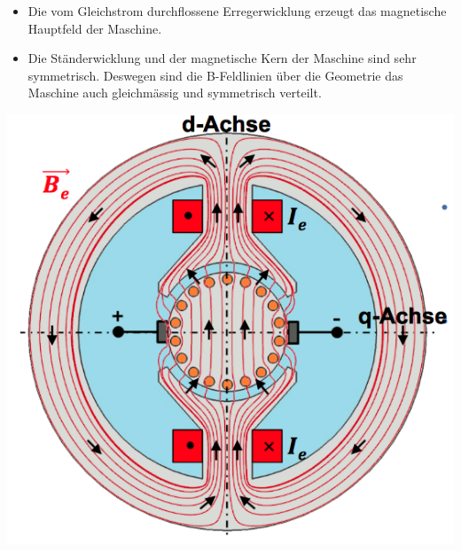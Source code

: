 \begin{minipage}{0.6 \linewidth}
\begin{itemize}
\item Die vom Gleichstrom durchflossene Erregerwicklung erzeugt das magnetische Hauptfeld der Maschine.
\item Die Ständerwicklung und der magnetische Kern der Maschine sind sehr symmetrisch. Deswegen sind die B-Feldlinien über die Geometrie das Maschine auch gleichmässig und symmetrisch verteilt. 
\end{itemize}
\end{minipage}
\begin{minipage}{0.4 \linewidth}
\includegraphics[width = \linewidth]{./Pics/VL45/Ankerruek2}
\end{minipage}


